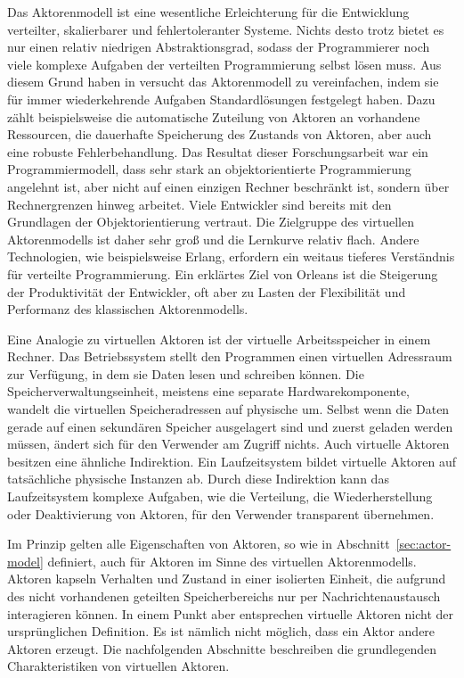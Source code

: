 Das Aktorenmodell ist eine wesentliche Erleichterung für die Entwicklung verteilter, skalierbarer und fehlertoleranter Systeme. Nichts desto trotz bietet es nur einen relativ niedrigen Abstraktionsgrad, sodass der Programmierer noch viele komplexe Aufgaben der verteilten Programmierung selbst lösen muss. Aus diesem Grund haben \citeauthor{virtualActors} in \cite{virtualActors} versucht das Aktorenmodell zu vereinfachen, indem sie für immer wiederkehrende Aufgaben Standardlösungen festgelegt haben. Dazu zählt beispielsweise die automatische Zuteilung von Aktoren an vorhandene Ressourcen, die dauerhafte Speicherung des Zustands von Aktoren, aber auch eine robuste Fehlerbehandlung. Das Resultat dieser Forschungsarbeit war ein Programmiermodell, dass sehr stark an objektorientierte Programmierung angelehnt ist, aber nicht auf einen einzigen Rechner beschränkt ist, sondern über Rechnergrenzen hinweg arbeitet. Viele Entwickler sind bereits mit den Grundlagen der Objektorientierung vertraut. Die Zielgruppe des virtuellen Aktorenmodells ist daher sehr groß und die Lernkurve relativ flach. Andere Technologien, wie beispielsweise Erlang, erfordern ein weitaus tieferes Verständnis für verteilte Programmierung. Ein erklärtes Ziel von Orleans ist die Steigerung der Produktivität der Entwickler, oft aber zu Lasten der Flexibilität und Performanz des klassischen Aktorenmodells.

Eine Analogie zu virtuellen Aktoren ist der virtuelle Arbeitsspeicher in einem Rechner. Das Betriebssystem stellt den Programmen einen virtuellen Adressraum zur Verfügung, in dem sie Daten lesen und schreiben können. Die Speicherverwaltungseinheit, meistens eine separate Hardwarekomponente, wandelt die virtuellen Speicheradressen auf physische um. Selbst wenn die Daten gerade auf einen sekundären Speicher ausgelagert sind und zuerst geladen werden müssen, ändert sich für den Verwender am Zugriff nichts. Auch virtuelle Aktoren besitzen eine ähnliche Indirektion. Ein Laufzeitsystem bildet virtuelle Aktoren auf tatsächliche physische Instanzen ab. Durch diese Indirektion kann das Laufzeitsystem komplexe Aufgaben, wie die Verteilung, die Wiederherstellung oder Deaktivierung von Aktoren, für den Verwender transparent übernehmen.

Im Prinzip gelten alle Eigenschaften von Aktoren, so wie in Abschnitt~\ref{sec:actor-model} definiert, auch für Aktoren im Sinne des virtuellen Aktorenmodells. \Dah Aktoren kapseln Verhalten und Zustand in einer isolierten Einheit, die aufgrund des nicht vorhandenen geteilten Speicherbereichs nur per Nachrichtenaustausch interagieren können. In einem Punkt aber entsprechen virtuelle Aktoren nicht der ursprünglichen Definition. Es ist nämlich nicht möglich, dass ein Aktor andere Aktoren erzeugt. Die nachfolgenden Abschnitte beschreiben die grundlegenden Charakteristiken von virtuellen Aktoren.

